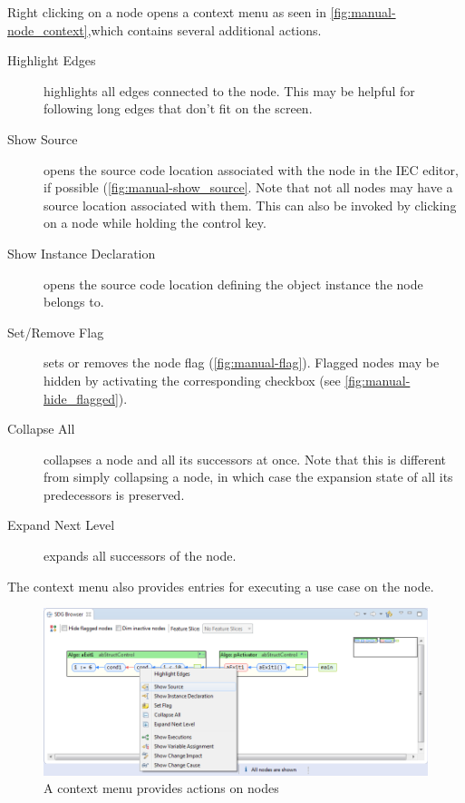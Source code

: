 Right clicking on a node opens a context menu as seen in \autoref{fig:manual-node_context},which contains several 
additional actions.

\begin{description}
  \item[Highlight Edges] highlights all edges connected to the node. This may be   helpful for following long edges 
  that don't fit on the screen.
  
  \item[Show Source] opens the source code location associated with the node in the IEC editor, if possible 
  (\autoref{fig:manual-show_source}. Note that not all nodes may have a source location associated with them. This can 
  also be invoked by clicking on a node while holding the control key.
  
  \item[Show Instance Declaration] opens the source code location defining the object instance the node belongs to.
  
  \item[Set/Remove Flag] sets or removes the node flag (\autoref{fig:manual-flag}). Flagged nodes may be hidden by 
  activating the corresponding checkbox (see \autoref{fig:manual-hide_flagged}).
  
  \item[Collapse All] collapses a node and all its successors at once. Note that this is different from simply 
  collapsing a node, in which case the expansion state of all its predecessors is preserved.
  
  \item[Expand Next Level] expands all successors of the node.
\end{description}

The context menu also provides entries for executing a use case on the node.

\begin{figure}[p]
  \centering
    \includegraphics[width=\textwidth]{bilder/manual-node_context}
  \caption{A context menu provides actions on nodes}
  \label{fig:manual-node_context}
\end{figure}

